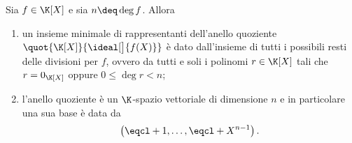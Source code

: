 \begin{theorem}\label{th:caratt_quot_polinomi}
    Sia $f \in \K[X]$ e sia $n \deq \deg f$. Allora \begin{enumerate}[label={(\roman*)}]
        \item un insieme minimale di rappresentanti dell'anello quoziente $\quot{\K[X]}{\ideal[\big]{f(X)}}$ è dato dall'insieme di tutti i possibili resti delle divisioni per $f$, ovvero da tutti e soli i polinomi $r \in \K[X]$ tali che $r = 0_{\K[X]}$ oppure $0 \leq \deg r < n$;
        \item l'anello quoziente è un $\K$-spazio vettoriale di dimensione $n$ e in particolare una sua base è data da \[
            \left( \eqcl+{1}, \dots, \eqcl+{X^{n-1}} \right).
        \]
    \end{enumerate}
\end{theorem}
